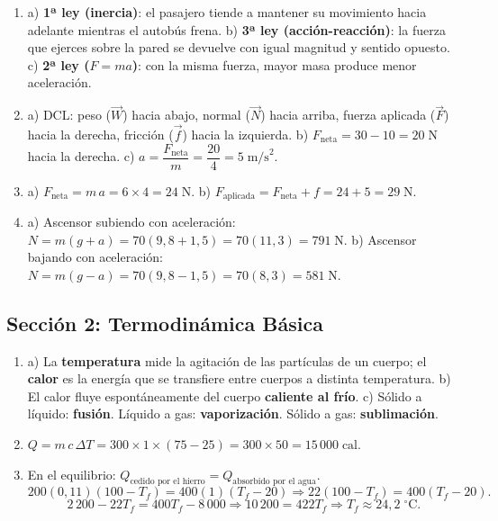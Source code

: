 \documentclass[12pt, letterpaper]{article}
\begin{document}
  \begin{enumerate}[leftmargin=*, label=\textbf{\arabic*.}]
    \item a) \textbf{1ª ley (inercia)}: el pasajero tiende a mantener su movimiento hacia adelante mientras el autobús frena.
          \quad b) \textbf{3ª ley (acción-reacción)}: la fuerza que ejerces sobre la pared se devuelve con igual magnitud y sentido opuesto.
          \quad c) \textbf{2ª ley ($F = ma$)}: con la misma fuerza, mayor masa produce menor aceleración.

    \item a) DCL: peso ($\vec{W}$) hacia abajo, normal ($\vec{N}$) hacia arriba, fuerza aplicada ($\vec{F}$) hacia la derecha, fricción ($\vec{f}$) hacia la izquierda.
          \quad b) $F_{\text{neta}} = 30 - 10 = 20\;\text{N}$ hacia la derecha.
          \quad c) $a = \dfrac{F_{\text{neta}}}{m} = \dfrac{20}{4} = 5\;\text{m/s}^2$.

    \item a) $F_{\text{neta}} = m\,a = 6 \times 4 = 24\;\text{N}$.
          \quad b) $F_{\text{aplicada}} = F_{\text{neta}} + f = 24 + 5 = 29\;\text{N}$.

    \item a) Ascensor subiendo con aceleración: $N = m(g + a) = 70(9{,}8 + 1{,}5) = 70(11{,}3) = 791\;\text{N}$.
          \quad b) Ascensor bajando con aceleración: $N = m(g - a) = 70(9{,}8 - 1{,}5) = 70(8{,}3) = 581\;\text{N}$.
  \end{enumerate}

  \newpage

  \subsection*{Sección 2: Termodinámica Básica}

  \begin{enumerate}[leftmargin=*, label=\textbf{\arabic*.}]
    \item a) La \textbf{temperatura} mide la agitación de las partículas de un cuerpo; el \textbf{calor} es la energía que se transfiere entre cuerpos a distinta temperatura.
          \quad b) El calor fluye espontáneamente del cuerpo \textbf{caliente al frío}.
          \quad c) Sólido a líquido: \textbf{fusión}. Líquido a gas: \textbf{vaporización}. Sólido a gas: \textbf{sublimación}.

    \item $Q = m\,c\,\Delta T = 300 \times 1 \times (75 - 25) = 300 \times 50 = 15\,000\;\text{cal}$.

    \item En el equilibrio: $Q_{\text{cedido por el hierro}} = Q_{\text{absorbido por el agua}}$.
          \[
            200(0{,}11)(100 - T_f) = 400(1)(T_f - 20) \Rightarrow 22(100 - T_f) = 400(T_f - 20).
          \]
          \[
            2\,200 - 22T_f = 400T_f - 8\,000 \Rightarrow 10\,200 = 422T_f \Rightarrow T_f \approx 24{,}2\;^\circ\text{C}.
          \]
  \end{enumerate}
\end{document}
